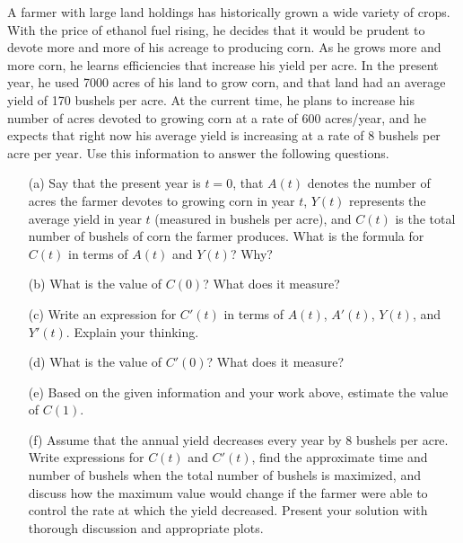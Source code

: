 \begin{lab}
    A farmer with large land holdings has historically grown a wide variety of crops.
    With the price of ethanol fuel rising, he decides that it would be prudent to devote
    more and more of his acreage to producing corn.  As he grows more and more corn, he
    learns efficiencies that increase his yield per acre.  In the present year, he used
    7000 acres of his land to grow corn, and that land had an average yield of 170 bushels
    per acre.  At the current time, he plans to increase his number of acres devoted to
    growing corn at a rate of 600 acres/year, and he expects that right now his average
    yield is increasing at a rate of 8 bushels per acre per year.  Use this information to
    answer the following questions.
    \begin{enumerate}
        \item[(a)] Say that the present year is $t = 0$, that $A(t)$ denotes the number of acres the farmer devotes to growing corn in year $t$, $Y(t)$ represents the average yield in year $t$ (measured in bushels per acre), and $C(t)$ is the total number of bushels of corn the farmer produces.  What is the formula for $C(t)$ in terms of $A(t)$ and $Y(t)$?  Why?
        \item[(b)] What is the value of $C(0)$?  What does it measure?
        \item[(c)] Write an expression for $C'(t)$ in terms of $A(t)$, $A'(t)$, $Y(t)$, and $Y'(t)$.  Explain your thinking.
        \item[(d)] What is the value of $C'(0)$?  What does it measure?
        \item[(e)] Based on the given information and your work above, estimate the value of $C(1)$.	
        \item[(f)] Assume that the annual yield decreases every year by 8 bushels per acre.  Write
        expressions for $C(t)$ and $C'(t)$, find the approximate time and number of
        bushels when the total number of bushels is maximized, and discuss how the maximum
        value would change if the farmer were able to control the rate at which the yield
        decreased. Present your solution with thorough discussion and appropriate plots.
\end{enumerate}
\end{lab}

